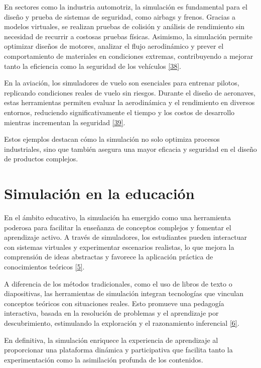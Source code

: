 \documentclass[12pt,oneside]{templates/unerthesis}
\begin{document}
En sectores como la industria automotriz, la simulación es fundamental para el diseño y prueba de sistemas de seguridad, como airbags y frenos. Gracias a modelos virtuales, se realizan pruebas de colisión y análisis de rendimiento sin necesidad de recurrir a costosas pruebas físicas. Asimismo, la simulación permite optimizar diseños de motores, analizar el flujo aerodinámico y prever el comportamiento de materiales en condiciones extremas, contribuyendo a mejorar tanto la eficiencia como la seguridad de los vehículos \protect\hyperlink{ref-stork_towards_2008}{{[}38{]}}.

En la aviación, los simuladores de vuelo son esenciales para entrenar pilotos, replicando condiciones reales de vuelo sin riesgos. Durante el diseño de aeronaves, estas herramientas permiten evaluar la aerodinámica y el rendimiento en diversos entornos, reduciendo significativamente el tiempo y los costos de desarrollo mientras incrementan la seguridad \protect\hyperlink{ref-jentsch_simulation_2017}{{[}39{]}}.

Estos ejemplos destacan cómo la simulación no solo optimiza procesos industriales, sino que también asegura una mayor eficacia y seguridad en el diseño de productos complejos.

\hypertarget{simulaciuxf3n-en-la-educaciuxf3n}{%
\section{Simulación en la educación}\label{simulaciuxf3n-en-la-educaciuxf3n}}

En el ámbito educativo, la simulación ha emergido como una herramienta poderosa para facilitar la enseñanza de conceptos complejos y fomentar el aprendizaje activo. A través de simuladores, los estudiantes pueden interactuar con sistemas virtuales y experimentar escenarios realistas, lo que mejora la comprensión de ideas abstractas y favorece la aplicación práctica de conocimientos teóricos \protect\hyperlink{ref-lion_simuladores_2005}{{[}5{]}}.

A diferencia de los métodos tradicionales, como el uso de libros de texto o diapositivas, las herramientas de simulación integran tecnologías que vinculan conceptos teóricos con situaciones reales. Esto promueve una pedagogía interactiva, basada en la resolución de problemas y el aprendizaje por descubrimiento, estimulando la exploración y el razonamiento inferencial \protect\hyperlink{ref-contreras_uso_2010}{{[}6{]}}.

En definitiva, la simulación enriquece la experiencia de aprendizaje al proporcionar una plataforma dinámica y participativa que facilita tanto la experimentación como la asimilación profunda de los contenidos.
\end{document}
